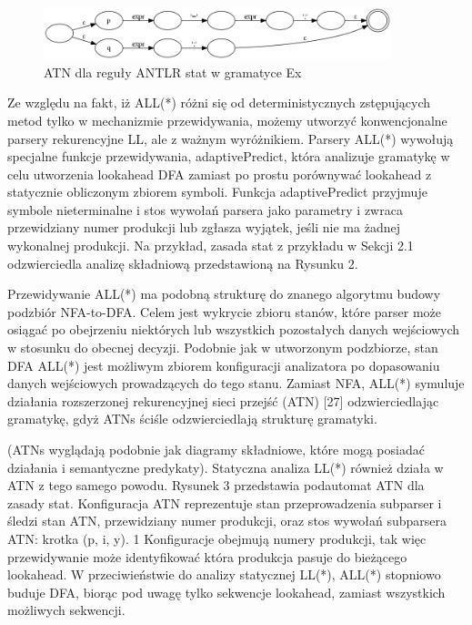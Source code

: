 \begin{figure}[h]
\includegraphics[width=0.9\textwidth]{Figure3.png}
\caption{ATN dla reguły ANTLR stat w gramatyce Ex}
\end{figure}
\par
Ze względu na fakt, iż ALL(*) różni się od deterministycznych zstępujących
metod tylko w mechanizmie przewidywania, możemy utworzyć konwencjonalne parsery
rekurencyjne LL, ale z ważnym wyróżnikiem.
Parsery ALL(*) wywołują specjalne funkcje przewidywania, adaptivePredict,
która analizuje gramatykę w celu utworzenia lookahead DFA
zamiast po prostu porównywać lookahead z statycznie obliczonym zbiorem symboli.
Funkcja adaptivePredict przyjmuje symbole nieterminalne i stos wywołań parsera
jako parametry i zwraca przewidziany numer produkcji lub zgłasza wyjątek,
jeśli nie ma żadnej wykonalnej produkcji. Na przykład, zasada stat z przykładu
w Sekcji 2.1 odzwierciedla analizę składniową przedstawioną na Rysunku 2.
\par
Przewidywanie ALL(*) ma podobną strukturę do znanego algorytmu budowy
podzbiór NFA-to-DFA. Celem jest wykrycie zbioru stanów, które parser może
osiągać po obejrzeniu niektórych lub wszystkich pozostałych danych wejściowych
w stosunku do obecnej decyzji. Podobnie jak w utworzonym podzbiorze,
stan DFA ALL(*) jest możliwym zbiorem konfiguracji analizatora po dopasowaniu
danych wejściowych prowadzących do tego stanu. Zamiast NFA, ALL(*) symuluje
działania rozszerzonej rekurencyjnej sieci przejść (ATN) [27]
odzwierciedlając gramatykę, gdyż ATNs ściśle odzwierciedlają strukturę gramatyki.
\par
(ATNs wyglądają podobnie jak diagramy składniowe, które mogą posiadać działania
i semantyczne predykaty). Statyczna analiza LL(*) również działa w ATN z tego
samego powodu. Rysunek 3 przedstawia podautomat ATN dla zasady stat.
Konfiguracja ATN reprezentuje stan przeprowadzenia subparser i śledzi stan ATN,
przewidziany numer produkcji, oraz stos wywołań subparsera ATN: krotka (p, i, y).
1 Konfiguracje obejmują numery produkcji, tak więc przewidywanie może identyfikować
która produkcja pasuje do bieżącego lookahead.
W przeciwieństwie do analizy statycznej LL(*), ALL(*) stopniowo buduje DFA,
biorąc pod uwagę tylko sekwencje lookahead, zamiast wszystkich możliwych sekwencji.

